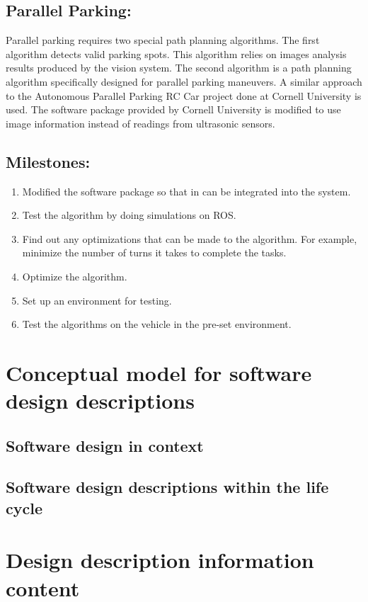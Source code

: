 \documentclass[compsoc,draftclsnofoot,onecolumn,10pt]{IEEEtran}
\begin{document}
\subsection{Parallel Parking:}
Parallel parking requires two special path planning algorithms. The first algorithm detects valid parking spots. This algorithm relies on images analysis results produced by the vision system. The second algorithm is a path planning algorithm specifically designed for parallel parking maneuvers. A similar approach to the Autonomous Parallel Parking RC Car project done at Cornell University is used. The software package provided by Cornell University is modified to use image information instead of readings from ultrasonic sensors.\par
\subsection{Milestones:}
\begin{enumerate}
	\item Modified the software package so that in can be integrated into the system.
	\item Test the algorithm by doing simulations on ROS.
	\item Find out any optimizations that can be made to the algorithm. For example, minimize the number of turns it takes to complete the tasks.
	\item Optimize the algorithm.
	\item Set up an environment for testing.
	\item Test the algorithms on the vehicle in the pre-set environment.
\end{enumerate}


\section{Conceptual model for software design descriptions} 
\subsection{Software design in context}
\subsection{Software design descriptions within the life cycle}

\section{Design description information content} 
\end{document}
